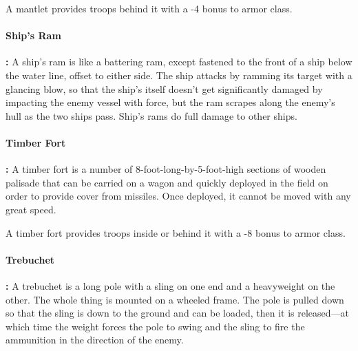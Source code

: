 \begin{multicols*}{2}
A mantlet provides troops behind it with a -4 bonus to armor class.

\paragraph{Ship’s Ram}\textbf{:} A ship’s ram is like a battering ram, except fastened to the front of a ship below the water line, offset to either side. The ship attacks by ramming its target with a glancing blow, so that the ship’s itself doesn’t get significantly damaged by impacting the enemy vessel with force, but the ram scrapes along the enemy’s hull as the two ships pass. Ship’s rams do full damage to other ships.

\paragraph{Timber Fort}\textbf{:} A timber fort is a number of 8-foot-long-by-5-foot-high sections of wooden palisade that can be carried on a wagon and quickly deployed in the field on order to provide cover from missiles. Once deployed, it cannot be moved with any great speed.

A timber fort provides troops inside or behind it with a -8 bonus to armor class.

\paragraph{Trebuchet}\textbf{:} A trebuchet is a long pole with a sling on one end and a heavyweight on the other. The whole thing is mounted on a wheeled frame. The pole is pulled down so that the sling is down to the ground and can be loaded, then it is released—at which time the weight forces the pole to swing and the sling to fire the ammunition in the direction of the enemy.

\end{multicols*}

